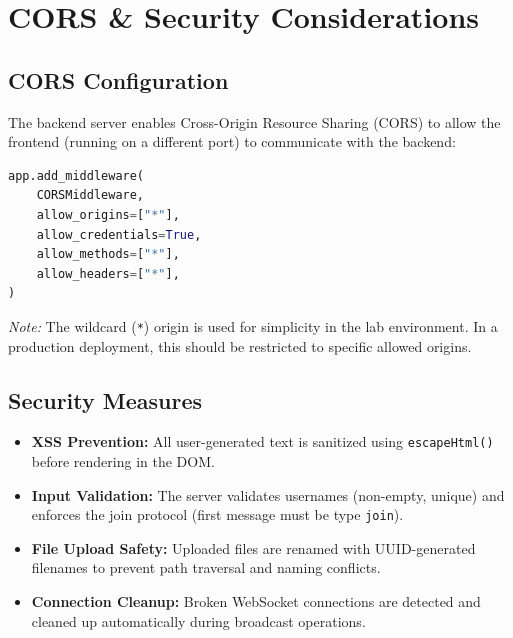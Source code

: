\documentclass[12pt, a4paper]{article}
\begin{document}
\section{CORS \& Security Considerations}

\subsection{CORS Configuration}
The backend server enables Cross-Origin Resource Sharing (CORS) to allow the frontend (running on a different port) to communicate with the backend:

\begin{lstlisting}[language=Python, caption={CORS Middleware Configuration}, label={lst:cors}]
app.add_middleware(
    CORSMiddleware,
    allow_origins=["*"],
    allow_credentials=True,
    allow_methods=["*"],
    allow_headers=["*"],
)
\end{lstlisting}

\textit{Note:} The wildcard (\texttt{*}) origin is used for simplicity in the lab environment. In a production deployment, this should be restricted to specific allowed origins.

\subsection{Security Measures}
\begin{itemize}[leftmargin=*]
    \item \textbf{XSS Prevention:} All user-generated text is sanitized using \texttt{escapeHtml()} before rendering in the DOM.
    \item \textbf{Input Validation:} The server validates usernames (non-empty, unique) and enforces the join protocol (first message must be type \texttt{join}).
    \item \textbf{File Upload Safety:} Uploaded files are renamed with UUID-generated filenames to prevent path traversal and naming conflicts.
    \item \textbf{Connection Cleanup:} Broken WebSocket connections are detected and cleaned up automatically during broadcast operations.
\end{itemize}


\end{document}
